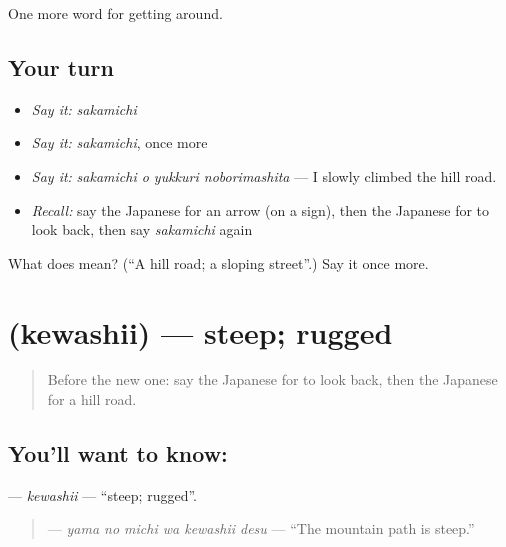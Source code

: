 \begin{grammarlens}[title={What you've built}]
One more word for getting around.
\end{grammarlens}

\subsection*{Your turn}
\begin{itemize}
\raggedright
  \item \emph{Say it:} \emph{sakamichi}
  \item \emph{Say it:} \emph{sakamichi}, once more
  \item \emph{Say it:} \emph{sakamichi o yukkuri noborimashita} — I slowly climbed the hill road.
  \item \emph{Recall:} say the Japanese for an arrow (on a sign), then the Japanese for to look back, then say \emph{sakamichi} again
\end{itemize}

\begin{tcolorbox}[breakable,colback=teal!4,colframe=teal!35!black,title={Before you move on}]
What does  mean? (\textquotedblleft{}A hill road; a sloping street\textquotedblright{}.) Say it once more.
\end{tcolorbox}
\section[\texorpdfstring{\ja{けわしい} (kewashii)}{けわしい (kewashii)}]{ (kewashii) — steep; rugged}

\label{lesson:JA-C394-kewashii}



\begin{quote}
Before the new one: say the Japanese for to look back, then the Japanese for a hill road.
\end{quote}

\subsection*{You'll want to know: }
\textbf{} — \emph{kewashii} — \textquotedblleft{}steep; rugged\textquotedblright{}.

\begin{quote}
\textbf{  } — \emph{yama no michi wa kewashii desu} — \textquotedblleft{}The mountain path is steep.\textquotedblright{}
\end{quote}


